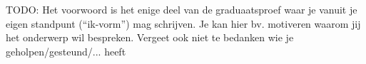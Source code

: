 
\chapter*{}%
\label{ch:voorwoord}

TODO:
Het voorwoord is het enige deel van de graduaatsproef waar je vanuit je
eigen standpunt (``ik-vorm'') mag schrijven. Je kan hier bv. motiveren
waarom jij het onderwerp wil bespreken.
Vergeet ook niet te bedanken wie je geholpen/gesteund/... heeft
